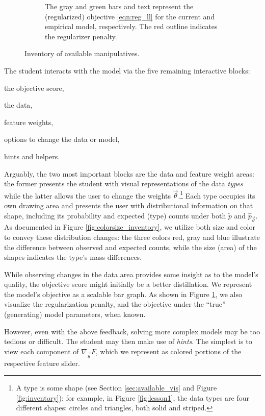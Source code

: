 \documentclass[11pt,letterpaper]{article}
\begin{document}
\begin{figure}[t]
\begin{center}
\begin{subfigure}[b]{\columnwidth}
\caption{The gray and green bars and text represent the (regularized) objective \eqref{eqn:reg_ll} for the current and empirical model, respectively. The red outline indicates the regularizer penalty.}
\label{fig:llbar}
\end{subfigure}

\caption{Inventory of available manipulatives.}
\label{fig:colormeaning}
\end{center}
\end{figure}

The student interacts with the model via the five remaining interactive blocks:
\begin{inparaenum}[(1)]
\item the objective score,
\item the data,
\item feature weights,
\item options to change the data or model,
\item hints and helpers.
\end{inparaenum}
Arguably, the two most important blocks are the data and feature weight areas: the former presents the student with visual representations of the data \textit{types} while the latter allows the user to change the weights $\vec{\theta}$.\footnote{A type is some shape (see Section \ref{sec:available_vis} and Figure \ref{fig:inventory}); for example, in Figure \ref{fig:lesson1}, the data types are four different shapes: circles and triangles, both solid and striped.} Each type occupies its own drawing area and presents the user with distributional information on that shape, including its probability and expected (type) counts under both $\tilde{p}$ and $\hat{p}_{\vec{\theta}}$.
As documented in Figure \ref{fig:colorsize_inventory}, we utilize both size and color to convey these distribution changes: the three colors red, gray and blue illustrate the difference between observed and expected counts, while the size (area) of the shapes indicates the type's mass differences.

While observing changes in the data area provides some insight as to the model's quality, the objective score might initially be a better distillation. We represent the model's objective as a scalable bar graph. As shown in Figure \ref{fig:llbar}, we also visualize the regularization penalty, and the objective under the ``true'' (generating) model parameters, when known.

However, even with the above feedback, solving more complex models may be too tedious or difficult. The student may then make use of \textit{hints}. The simplest is to view each component of $\nabla_{\vec{\theta}} F$, which we represent as colored portions of the respective feature slider.
\end{document}
